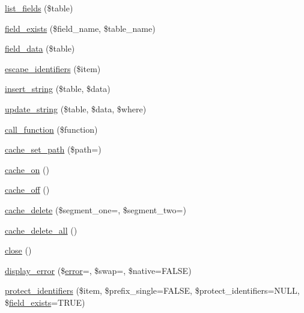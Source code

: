 \begin{DoxyCompactItemize}
\item 
\mbox{\hyperlink{class_c_i___d_b__driver_aef08cd376b16b24608100ca0e3f2f85b}{list\+\_\+fields}} (\$table)
\item 
\mbox{\hyperlink{class_c_i___d_b__driver_ad349ffee1eed59a2eb8f0f1d3033764f}{field\+\_\+exists}} (\$field\+\_\+name, \$table\+\_\+name)
\item 
\mbox{\hyperlink{class_c_i___d_b__driver_a90355121e1ed009e0efdbd544ab56efa}{field\+\_\+data}} (\$table)
\item 
\mbox{\hyperlink{class_c_i___d_b__driver_abe5c555644f8bac97c3f84c7d2325fdc}{escape\+\_\+identifiers}} (\$item)
\item 
\mbox{\hyperlink{class_c_i___d_b__driver_ad27720d886add2c9abf9ac48a9ff56d5}{insert\+\_\+string}} (\$table, \$data)
\item 
\mbox{\hyperlink{class_c_i___d_b__driver_af9eb76a74d10fa81e44ecb0dd9bf00d4}{update\+\_\+string}} (\$table, \$data, \$where)
\item 
\mbox{\hyperlink{class_c_i___d_b__driver_af7892f758c89d0e243def92140dbe099}{call\+\_\+function}} (\$function)
\item 
\mbox{\hyperlink{class_c_i___d_b__driver_aec8df4c9b46f8ba06831911d4c3121df}{cache\+\_\+set\+\_\+path}} (\$path=\textquotesingle{}\textquotesingle{})
\item 
\mbox{\hyperlink{class_c_i___d_b__driver_a69ca9bb8bc31400922a565d5c4d64d8d}{cache\+\_\+on}} ()
\item 
\mbox{\hyperlink{class_c_i___d_b__driver_ae577e2be88cb5f0d184f76dc6fd87482}{cache\+\_\+off}} ()
\item 
\mbox{\hyperlink{class_c_i___d_b__driver_a4ccac0d027f9e49091f98d0acbbff13c}{cache\+\_\+delete}} (\$segment\+\_\+one=\textquotesingle{}\textquotesingle{}, \$segment\+\_\+two=\textquotesingle{}\textquotesingle{})
\item 
\mbox{\hyperlink{class_c_i___d_b__driver_a6e74f4d3938c78892f490b4f11faf318}{cache\+\_\+delete\+\_\+all}} ()
\item 
\mbox{\hyperlink{class_c_i___d_b__driver_aa69c8bf1f1dcf4e72552efff1fe3e87e}{close}} ()
\item 
\mbox{\hyperlink{class_c_i___d_b__driver_a1ca178ae41a8c6c0e461dfb2653cfd81}{display\+\_\+error}} (\$\mbox{\hyperlink{class_c_i___d_b__driver_a43b8d30b879d4f09ceb059b02af2bc02}{error}}=\textquotesingle{}\textquotesingle{}, \$swap=\textquotesingle{}\textquotesingle{}, \$native=F\+A\+L\+SE)
\item 
\mbox{\hyperlink{class_c_i___d_b__driver_ade8e28ac268bbe2f985c5359bc949f21}{protect\+\_\+identifiers}} (\$item, \$prefix\+\_\+single=F\+A\+L\+SE, \$protect\+\_\+identifiers=N\+U\+LL, \$\mbox{\hyperlink{class_c_i___d_b__driver_ad349ffee1eed59a2eb8f0f1d3033764f}{field\+\_\+exists}}=T\+R\+UE)
\end{DoxyCompactItemize}
